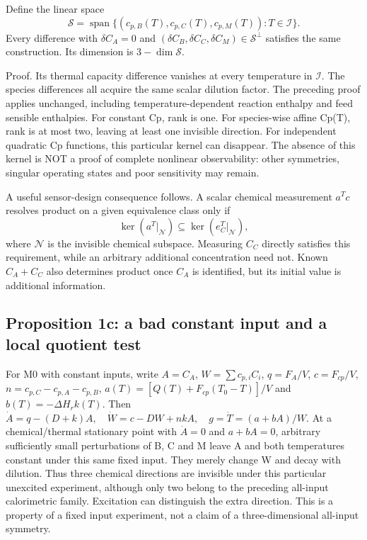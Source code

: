 \documentclass[
  11pt,
]{article}
\begin{document}
Define the linear space
\[\mathcal S=\operatorname{span}\{(c_{p,B}(T),c_{p,C}(T),c_{p,M}(T)):T\in\mathcal I\}.\]
Every difference with \(\delta C_A=0\) and
\((\delta C_B,\delta C_C,\delta C_M)\in\mathcal S^\perp\) satisfies the
same construction. Its dimension is \(3-\dim\mathcal S\).

Proof. Its thermal capacity difference vanishes at every temperature in
\(\mathcal I\). The species differences all acquire the same scalar
dilution factor. The preceding proof applies unchanged, including
temperature-dependent reaction enthalpy and feed sensible enthalpies.
For constant Cp, rank is one. For species-wise affine Cp(T), rank is at
most two, leaving at least one invisible direction. For independent
quadratic Cp functions, this particular kernel can disappear. The
absence of this kernel is NOT a proof of complete nonlinear
observability: other symmetries, singular operating states and poor
sensitivity may remain.

A useful sensor-design consequence follows. A scalar chemical
measurement \(a^Tc\) resolves product on a given equivalence class only
if \[\ker(a^T|_{\mathcal N})\subseteq\ker(e_C^T|_{\mathcal N}),\] where
\(\mathcal N\) is the invisible chemical subspace. Measuring \(C_C\)
directly satisfies this requirement, while an arbitrary additional
concentration need not. Known \(C_A+C_C\) also determines product once
\(C_A\) is identified, but its initial value is additional information.

\hypertarget{proposition-1c-a-bad-constant-input-and-a-local-quotient-test}{%
\subsection{Proposition 1c: a bad constant input and a local quotient
test}\label{proposition-1c-a-bad-constant-input-and-a-local-quotient-test}}

For M0 with constant inputs, write \(A=C_A\), \(W=\sum c_{p,i}C_i\),
\(q=F_A/V\), \(c=F_{cp}/V\), \(n=c_{p,C}-c_{p,A}-c_{p,B}\),
\(a(T)=[Q(T)+F_{cp}(T_0-T)]/V\) and \(b(T)=-\Delta H_r k(T)\). Then
\(\dot A=q-(D+k)A,\quad\dot W=c-DW+nkA,\quad g=\dot T=(a+bA)/W.\) At a
chemical/thermal stationary point with \(\dot A=0\) and \(a+bA=0\),
arbitrary sufficiently small perturbations of B, C and M leave A and
both temperatures constant under this same fixed input. They merely
change W and decay with dilution. Thus three chemical directions are
invisible under this particular unexcited experiment, although only two
belong to the preceding all-input calorimetric family. Excitation can
distinguish the extra direction. This is a property of a fixed input
experiment, not a claim of a three-dimensional all-input symmetry.
\end{document}
